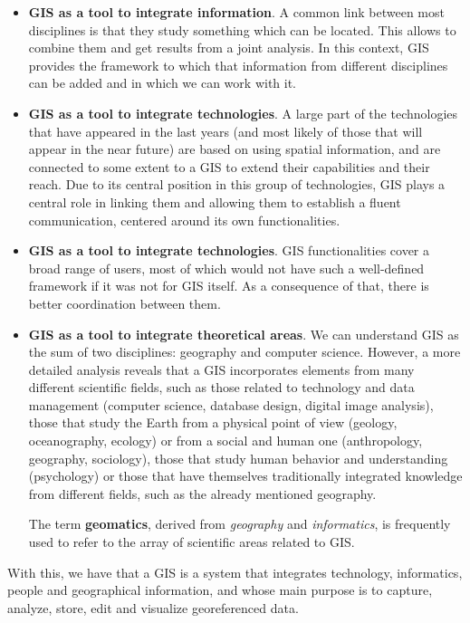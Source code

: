 \begin{itemize}
\item \textbf{GIS as a tool to integrate information}. A common link between most disciplines is that they study something which can be located. This allows to combine them and get results from a joint analysis. In this context, GIS provides the framework to which that information from different disciplines can be added and in which we can work with it. 

\item \textbf{GIS as a tool to integrate technologies}. A large part of the technologies that have appeared in the last years (and most likely of those that will appear in the near future) are based on using spatial information, and are connected to some extent to a GIS to extend their capabilities and their reach. Due to its central position in this group of technologies, GIS plays a central role in linking them and allowing them to establish a fluent communication, centered around its own functionalities.


\item \textbf{GIS as a tool to integrate technologies}. GIS functionalities cover a broad range of users, most of which would not have such a well-defined framework if it was not for GIS itself. As a consequence of that, there is  better coordination between them.

\item \textbf{GIS as a tool to integrate theoretical areas}. We can understand GIS as the sum of two disciplines: geography and computer science. However, a more detailed analysis reveals that a GIS incorporates elements from many different scientific fields, such as those related to technology and data management (computer science, database design, digital image analysis), those that study the Earth from a physical point of view (geology, oceanography, ecology) or from a social and human one (anthropology, geography, sociology), those that study human behavior and understanding (psychology) or those that have themselves traditionally integrated knowledge from different fields, such as the already mentioned geography.

The term \textbf{geomatics}, derived from \emph{geography} and \emph{informatics}, is frequently used to refer to the array of scientific areas related to GIS.
\end{itemize}

With this, we have that a GIS is a system that integrates technology, informatics, people and geographical information, and whose main purpose is to capture, analyze, store, edit and visualize georeferenced data.

